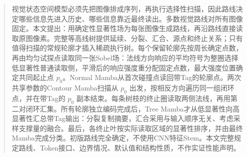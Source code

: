 \begin{abstract}
视觉状态空间模型必须先把图像排成序列，再执行选择性扫描，因此路线决定哪些信息先进入历史、哪些信息靠近最终读出。多数视觉路线对所有图像固定。本文提出\method：用确定性显著性场为每张图像生成路线，再沿路线直接读取原图像素。完整等高线树提供延续、分裂、汇合、源点和终止关系；只有值得扫描的常规轮廓才插入稀疏执行树。每个保留轮廓先按周长确定点数，再由均匀试探点读取同一张Sobel场：法线方向响应的平均符号为整圈选择低显著性普通读取侧，平滑后的响应强度重分配固定点数，最大强度位置确定共同起止点 $p_0$。Normal Mamba从首次碰撞点读回带Tag的轮廓点。两次共享参数的Contour Mamba扫描从 $p_0$ 出发，按相反方向遍历同一组闭环点，并在带Tag的 $p_0$ 副本结束。每条树枝的终止圈读取两侧法线，再用第二对闭环汇集。所有轮廓独立编码完成后，Tree Mamba才从低显著性向高显著性汇总带Tag输出：分裂复制摘要，汇合采用与输入顺序无关、考虑采样支撑量的融合。最后，各终止叶按实际读取区域的显著性排序，并由最终Mamba完成分类。初版路线完全确定，不使用CNN特征Stem。本文完整规定路线、Token接口、边界情况、默认值和结构性质，不作实证性能声明。
\end{abstract}
